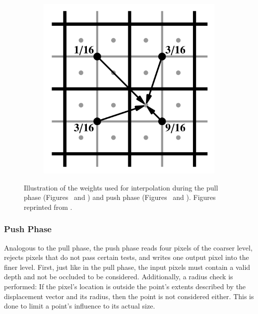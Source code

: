 \begin{figure}[htb]
\begin{subfigure}[b]{0.25\textwidth}
    \caption{\label{fig:concept:weights_marroquim3}}
  \end{subfigure}%
  \begin{subfigure}[b]{0.25\textwidth}
    \centering\includegraphics[width=\textwidth]{graphics/push_weights_marroquim2}
    \caption{\label{fig:concept:weights_marroquim4}}
  \end{subfigure}
  \caption{Illustration of the weights used for interpolation during the pull phase (Figures~  and ) and push phase (Figures~ and ). Figures reprinted from \citet{Marroquim:2007:reconstruction}.}
  \label{fig:concept:weights_marroquim}
\end{figure}



\subsubsection{Push Phase}

Analogous to the pull phase, the push phase reads four pixels of the coarser level, rejects pixels that do not pass certain tests, and writes one output pixel into the finer level. First, just like in the pull phase, the input pixels must contain a valid depth and not be occluded to be considered. Additionally, a radius check is performed: If the pixel's location is outside the point's extents described by the displacement vector and its radius, then the point is not considered either. This is done to limit a point's influence to its actual size.

